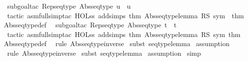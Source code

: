 \begin{isabellebody}
\isamarkupfalse%
\ {\isacharparenleft}subgoal{\isacharunderscore}tac\ {\isachardoublequoteopen}Rep{\isacharunderscore}seqtype\ {\isacharparenleft}Abs{\isacharunderscore}seqtype\ u{\isacharparenright}\ {\isacharequal}\ u{\isachardoublequoteclose}{\isacharparenright}\isanewline
{}\isamarkupfalse%
\ {\isacharparenleft}tactic\ {\isacharverbatimopen}asm{\isacharunderscore}full{\isacharunderscore}simp{\isacharunderscore}tac\ {\isacharparenleft}HOL{\isacharunderscore}ss\ addsimps\ {\isacharbrackleft}thm\ {\isachardoublequote}Abs{\isacharunderscore}seqtype{\isacharunderscore}lemma{\isachardoublequote}\ RS\ sym{\isacharcomma}\ \ thm\ {\isachardoublequote}Abs{\isacharunderscore}seqtype{\isacharunderscore}def{\isachardoublequote}{\isacharbrackright}{\isacharparenright}\ {}{\isacharverbatimclose}{\isacharparenright}\isanewline
{}\isamarkupfalse%
\ {\isacharparenleft}subgoal{\isacharunderscore}tac\ {\isachardoublequoteopen}Rep{\isacharunderscore}seqtype\ {\isacharparenleft}Abs{\isacharunderscore}seqtype\ t{\isacharparenright}\ {\isacharequal}\ t{\isachardoublequoteclose}{\isacharparenright}\isanewline
{}\isamarkupfalse%
\ {\isacharparenleft}tactic\ {\isacharverbatimopen}asm{\isacharunderscore}full{\isacharunderscore}simp{\isacharunderscore}tac\ {\isacharparenleft}HOL{\isacharunderscore}ss\ addsimps\ {\isacharbrackleft}thm\ {\isachardoublequote}Abs{\isacharunderscore}seqtype{\isacharunderscore}lemma{\isachardoublequote}\ RS\ sym{\isacharcomma}\ thm\ {\isachardoublequote}Abs{\isacharunderscore}seqtype{\isacharunderscore}def{\isachardoublequote}{\isacharbrackright}{\isacharparenright}\ {}{\isacharverbatimclose}{\isacharparenright}\isanewline
{}\isamarkupfalse%
\ {\isacharparenleft}rule\ Abs{\isacharunderscore}seqtype{\isacharunderscore}inverse{\isacharparenright}\isanewline
{}\isamarkupfalse%
\ {\isacharparenleft}subst\ seqtype{\isacharunderscore}lemma{\isacharparenright}\isanewline
{}\isamarkupfalse%
\ assumption\isanewline
{}\isamarkupfalse%
\ {\isacharparenleft}rule\ Abs{\isacharunderscore}seqtype{\isacharunderscore}inverse{\isacharparenright}\isanewline
{}\isamarkupfalse%
\ {\isacharparenleft}subst\ seqtype{\isacharunderscore}lemma{\isacharparenright}\isanewline
{}\isamarkupfalse%
\ assumption\isanewline
{}\isamarkupfalse%
\ simp\isanewline
{}\isamarkupfalse%
%
\endisatagproof
{\isafoldproof}%
%
\isadelimproof
\isanewline
%
\endisadelimproof
\isanewline

\end{isabellebody}
